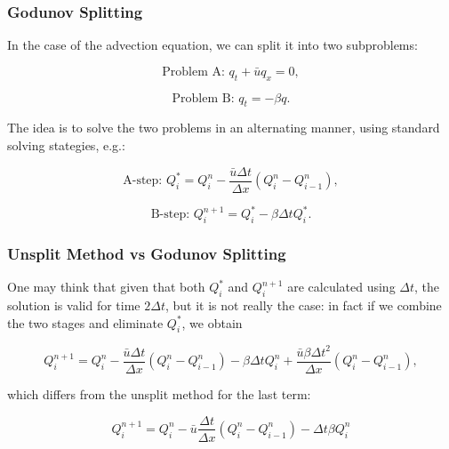 \documentclass{beamer}
\renewcommand{\d}{\Delta}
\begin{document}
\begin{frame}
	\frametitle{Godunov Splitting}
	In the case of the advection equation, we can split it into two subproblems:

	\begin{equation}\label{eq:probA}
		\text{Problem A: } q_t+\bar{u}q_x=0,
	\end{equation}

	\begin{equation}\label{eq:probB}
		\text{Problem B: } q_t = -\beta q.
	\end{equation}

	The idea is to solve the two problems in an alternating manner, using standard solving stategies, e.g.:

	\begin{equation}\label{eq:stepA}
		\text{A-step: } Q_i^* = Q_i^n - \frac{\bar{u}\d t}{\d x} (Q_i^n-Q_{i-1}^n),
	\end{equation}

	\begin{equation}\label{eq:stepB}
		\text{B-step: } Q_i^{n+1} = Q_i^*-\beta\d tQ_i^*.
	\end{equation}

\end{frame}

\begin{frame}
	\frametitle{Unsplit Method vs Godunov Splitting}

	One may think that given that both $Q_i^*$ and $Q_i^{n+1}$ are calculated using $\d t$, the solution is valid for time $2\d t$, but it is not really the case: in fact if we combine the two stages and eliminate $Q_i^*$, we obtain

	\begin{equation*}
		Q_i^{n+1} = Q_i^n -\frac{\bar{u}\d t}{\d x}(Q_i^n-Q_{i-1}^n)-\beta\d tQ_i^n +\frac{\bar{u}\beta\d t^2}{\d x}(Q_i^n-Q_{i-1}^n),
	\end{equation*}

	which differs from the unsplit method for the last term:

	\begin{equation*}
		Q^{n+1}_i = Q^n_i-\bar{u} \frac{\d t}{\d x}(Q^n_i-Q^n_{i-1})-\d t\beta Q^n_i
	\end{equation*}

\end{frame}
\end{document}
